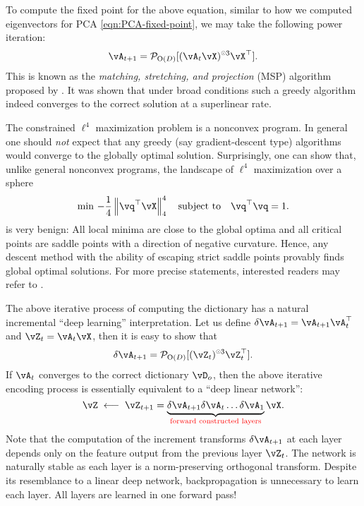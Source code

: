 \documentclass[../../book-main.tex]{subfiles}
\begin{document}
To compute the fixed point for the above equation, similar to how we computed
eigenvectors for PCA \eqref{eqn:PCA-fixed-point}, we may take the following
power iteration:
\begin{equation}\label{eq:msp_iteration}
    \vA_{t+1} = \mathcal{P}_{\mathrm O(D)}[( {\vA_t \vX})^{\hada 3}\vX^\top].
\end{equation}
This is known as the {\em matching, stretching, and projection} (MSP) algorithm proposed by \cite{Zhai-2020}. It was shown that under broad conditions such a greedy algorithm indeed converges to the correct solution at a superlinear rate.

\begin{remark}\label{rem:L4-global}
The constrained $\ell^4$ maximization problem is a nonconvex program. In general one should \textit{not} expect that any greedy (say gradient-descent type) algorithms would converge to the globally optimal solution. Surprisingly, one can show that, unlike general nonconvex programs, the landscape of $\ell^4$ maximization over a sphere
\begin{equation}\label{eq:l4-maximization-sphere}
    \min\,
    -   \frac{1}{4} \norm*{
    \vq^\top \vX
    }_4^4 \quad \mbox{subject to} \quad  \vq^\top\vq = 1.
\end{equation}
is very benign: All local minima are close to the global optima and all critical points are saddle points with a direction of negative curvature. Hence, any descent method with the ability of escaping strict saddle points provably finds global optimal solutions. For more precise statements, interested readers may refer to \cite{Qu2020Geometric}. 
\end{remark}

\begin{remark}
The above iterative process of computing the dictionary has a natural incremental ``deep learning'' interpretation. Let us define 
$\delta \vA_{t+1} = \vA_{t+1}\vA_{t}^\top$ and $\vZ_t = \vA_t \vX$, then it is easy to show that
$$\delta \vA_{t+1} = \mathcal{P}_{\mathrm O(D)}[(\vZ_t)^{\hada 3} \vZ_t^\top].$$ 
If $\vA_t$ converges to the correct dictionary $\vD_o$, then the above iterative encoding process is essentially equivalent to a ``deep linear network'': 
$$\vZ \; \longleftarrow \; \vZ_{t+1} =  \underbrace{\delta \vA_{t+1} \delta \vA_{t} \ldots \delta \vA_{1}}_{\color{red} \text{forward constructed layers}} \vX.$$
Note that the computation of the increment transforms $\delta \vA_{t+1}$ at each layer depends only on the feature output from the previous layer $\vZ_t$. The network is naturally stable as each layer is a norm-preserving orthogonal transform. Despite its resemblance to a linear deep network, backpropagation is unnecessary to learn each layer. All layers are learned in one forward pass!
\end{remark}
\end{document}
